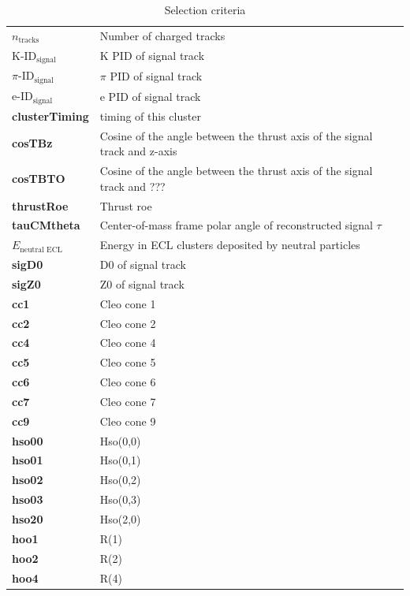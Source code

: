 \documentclass[12pt]{thesis}  %
\begin{document}
\begin{table}[h]
\begin{tabular}{ll}
$n_{\text{tracks}}$ & Number of charged tracks  \\
$\text{K-ID}_{\text{signal}}$ & K PID of signal track\\
$\pi\text{-ID}_{\text{signal}}$ & $\pi$ PID of signal track \\
$\text{e-ID}_{\text{signal}}$ & e PID of signal track  \\
\textbf{clusterTiming} & timing of this cluster   \\
\textbf{cosTBz} & Cosine of the angle between the thrust axis of the signal track and z-axis   \\
\textbf{cosTBTO} & Cosine of the angle between the thrust axis of the signal track and ???  \\
\textbf{thrustRoe} & Thrust roe   \\
\textbf{tauCMtheta} & Center-of-mass frame polar angle of reconstructed signal $\tau$ \\
$E_{\text{neutral ECL}}$ & Energy in ECL clusters deposited by neutral particles \\
\textbf{sigD0} & D0 of signal track  \\
\textbf{sigZ0} & Z0 of signal track \\
\textbf{cc1} & Cleo cone 1   \\
\textbf{cc2} & Cleo cone 2 \\
\textbf{cc4} & Cleo cone 4  \\
\textbf{cc5} & Cleo cone 5   \\
\textbf{cc6} & Cleo cone 6  \\
\textbf{cc7} & Cleo cone 7 \\
\textbf{cc9} & Cleo cone 9  \\
\textbf{hso00} & Hso(0,0)  \\
\textbf{hso01} & Hso(0,1)   \\
\textbf{hso02} & Hso(0,2)  \\
\textbf{hso03} & Hso(0,3)  \\
\textbf{hso20} & Hso(2,0)  \\
\textbf{hoo1} & R(1)  \\
\textbf{hoo2} & R(2) \\
\textbf{hoo4} & R(4)  \\
\end{tabular}
\caption{Selection criteria}
\label{my-label}
\end{table}

\pagebreak

\end{document}
